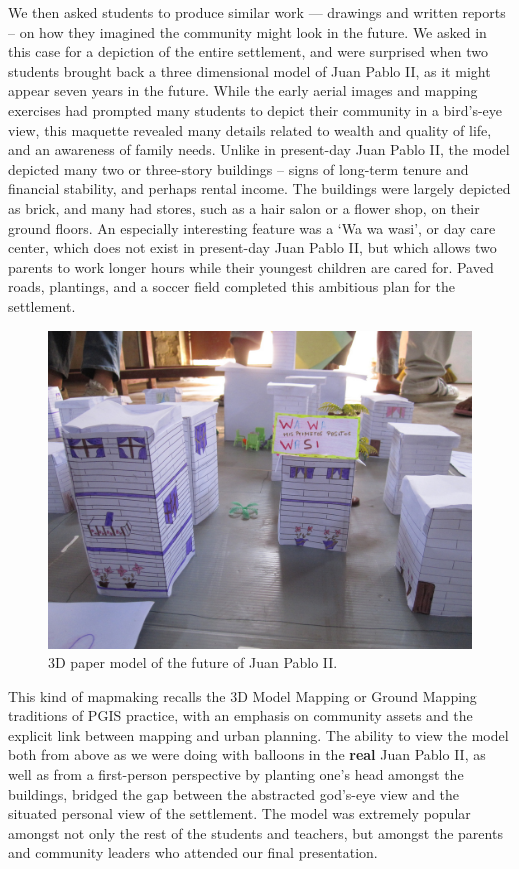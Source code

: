 \documentclass[11pt,oneside,notitlepage]{report}
\begin{document}
{{We then asked students to produce similar work --- drawings and written reports -- on how they imagined the community might look in the future. We asked in this case for a depiction of the entire settlement, and were surprised when two students brought back a three dimensional model of Juan Pablo II, as it might appear seven years in the future. While the early aerial images and mapping exercises had prompted many students to depict their community in a bird's-eye view, this maquette revealed many details related to wealth and quality of life, and an awareness of family needs. Unlike in present-day Juan Pablo II, the model depicted many two or three-story buildings -- signs of long-term tenure and financial stability, and perhaps rental income. The buildings were largely depicted as brick, and many had stores, such as a hair salon or a flower shop, on their ground floors. An especially interesting feature was a `Wa wa wasi', or day care center, which does not exist in present-day Juan Pablo II, but which allows two parents to work longer hours while their youngest children are cared for. Paved roads, plantings, and a soccer field completed this ambitious plan for the settlement.

\begin{figure}[h]
  \begin{center}
	\includegraphics[width=1\textwidth]{images/juan-pablo-maqueta.jpg}
	\caption{3D paper model of the future of Juan Pablo II.}
  \end{center}
\end{figure}

This kind of mapmaking recalls the 3D Model Mapping or Ground Mapping traditions of \ac{PGIS} practice, with an emphasis on community assets and the explicit link between mapping and urban planning. The ability to view the model both from above as we were doing with balloons in the \textbf{real} Juan Pablo II, as well as from a first-person perspective by planting one's head amongst the buildings, bridged the gap between the abstracted god's-eye view and the situated personal view of the settlement. The model was extremely popular amongst not only the rest of the students and teachers, but amongst the parents and community leaders who attended our final presentation. 

}}
\end{document}
